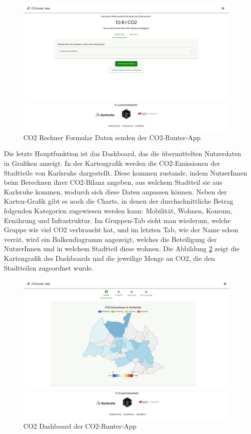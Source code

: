 \begin{figure}[h]
    \centering
    \includegraphics[width=1\textwidth]{images/02/CO2-Runter-App-Daten-Senden.jpeg}
    \caption{CO2 Rechner Formular Daten senden der CO2-Runter-App}
    \label{fig:co2runterapp-send}
\end{figure}

Die letzte Hauptfunktion ist das Dashboard, das die übermittelten Nutzerdaten in Grafiken anzeigt. In der Kartengrafik werden die CO2-Emissionen der Stadtteile von Karlsruhe dargestellt. Diese kommen zustande, indem NutzerInnen beim Berechnen ihrer CO2-Bilanz angeben, aus welchem Stadtteil sie aus Karlsruhe kommen, wodurch sich diese Daten anpassen können. Neben der Karten-Grafik gibt es noch die Charts, in denen der durchschnittliche Betrag folgenden Kategorien zugewiesen werden kann: Mobilität, Wohnen, Konsum, Ernährung und Infrastruktur. Im Gruppen-Tab sieht man wiederum, welche Gruppe wie viel CO2 verbraucht hat, und im letzten Tab, wie der Name schon verrät, wird ein Balkendiagramm angezeigt, welches die Beteiligung der NutzerInnen und in welchem Stadtteil diese wohnen. Die Abbildung \ref{fig:co2runterapp-dashboard} zeigt die Kartengrafik des Dashboards und die jeweilige Menge an CO2, die den Stadtteilen zugeordnet wurde.

\begin{figure}[h]
    \centering
    \includegraphics[width=1\textwidth]{images/02/CO2-Runter-App-Dashboard.jpeg}
    \caption{CO2 Dashboard der CO2-Runter-App}
    \label{fig:co2runterapp-dashboard}
\end{figure}


